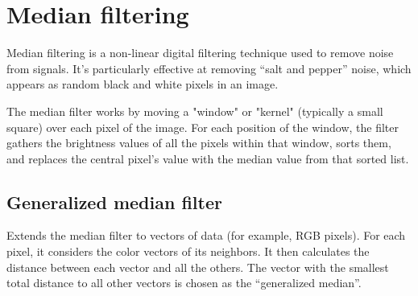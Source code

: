 \chapter{Median filtering}

Median filtering is a non-linear digital filtering technique used to
remove noise from signals. It's particularly effective at removing
``salt and pepper'' noise, which appears as random black and white
pixels in an image. 

The median filter works by moving a "window" or "kernel" (typically a
small square) over each pixel of the image. For each position of the
window, the filter gathers the brightness values of all the pixels
within that window, sorts them, and replaces the central pixel's value
with the median value from that sorted list.

\section{Generalized median filter}
Extends the median filter to vectors of data (for example, RGB
pixels). For each pixel, it considers the color vectors of its
neighbors. It then calculates the distance between each vector and all
the others. The vector with the smallest total distance to all other
vectors is chosen as the ``generalized median''.
